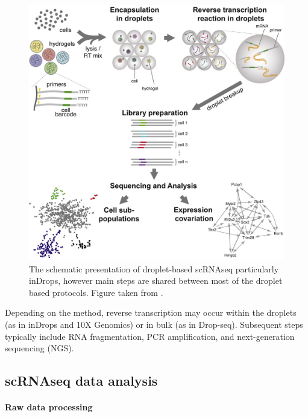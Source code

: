 \begin{figure}
  \centering
  \includegraphics[width=\linewidth]{images/scAnalysisPipeline.jpg}
  \caption{The schematic presentation of droplet-based scRNAseq
  particularly inDrops, however main steps are shared between most of the droplet based protocols.
  Figure taken from \textcite{Klein2015}.}
  \label{fig:inDropsPipeline}
\end{figure}

Depending on the method, reverse transcription may occur within the droplets
(as in inDrops and 10X Genomics) or in bulk (as in Drop-seq).
Subsequent steps typically include RNA fragmentation, PCR amplification, and next-generation sequencing (NGS).	


\subsection{scRNAseq data analysis}

\paragraph{Raw data processing}

